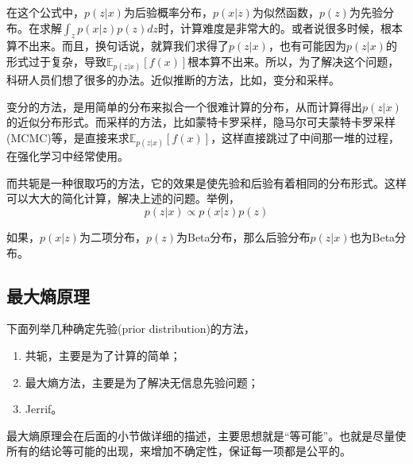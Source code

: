 \documentclass[a4paper]{article}
\begin{document}
在这个公式中，$p(z|x)$为后验概率分布，$p(x|z)$为似然函数，$p(z)$为先验分布。在求解$\int_{z}p(x|z)p(z)dz$时，计算难度是非常大的。或者说很多时候，根本算不出来。而且，换句话说，就算我们求得了$p(z|x)$，也有可能因为$p(z|x)$的形式过于复杂，导致$\mathbb{E}_{p(z|x)}[f(x)]$根本算不出来。所以，为了解决这个问题，科研人员们想了很多的办法。近似推断的方法，比如，变分和采样。

变分的方法，是用简单的分布来拟合一个很难计算的分布，从而计算得出$p(z|x)$的近似分布形式。而采样的方法，比如蒙特卡罗采样，隐马尔可夫蒙特卡罗采样(MCMC)等，是直接来求$\mathbb{E}_{p(z|x)}[f(x)]$，这样直接跳过了中间那一堆的过程，在强化学习中经常使用。

而共轭是一种很取巧的方法，它的效果是使先验和后验有着相同的分布形式。这样可以大大的简化计算，解决上述的问题。举例，
\begin{equation}
    p(z|x)\varpropto p(x|z)p(z)
\end{equation}

如果，$p(x|z)$为二项分布，$p(z)$为Beta分布，那么后验分布$p(z|x)$也为Beta分布。

\subsection{最大熵原理}
下面列举几种确定先验(prior distribution)的方法，
\begin{enumerate}[itemindent = 1em, itemsep = 0.4pt, parsep=0.5pt, topsep = 0.5pt]
\item 共轭，主要是为了计算的简单；
\item 最大熵方法，主要是为了解决无信息先验问题；
\item Jerrif。
\end{enumerate}

最大熵原理会在后面的小节做详细的描述，主要思想就是“等可能”。也就是尽量使所有的结论等可能的出现，来增加不确定性，保证每一项都是公平的。
\end{document}
